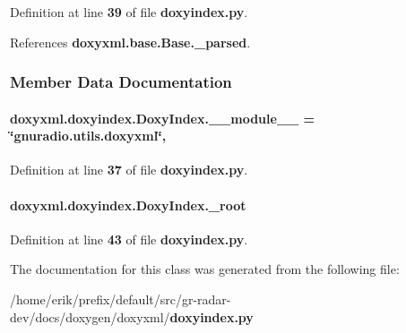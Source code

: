 Definition at line {\bf 39} of file {\bf doxyindex.\+py}.



References {\bf doxyxml.\+base.\+Base.\+\_\+parsed}.



\subsubsection{Member Data Documentation}
\paragraph[{\+\_\+\+\_\+module\+\_\+\+\_\+}]{ doxyxml.\+doxyindex.\+Doxy\+Index.\+\_\+\+\_\+module\+\_\+\+\_\+ = \char`\"{}gnuradio.\+utils.\+doxyxml\char`\"{}\hspace{0.3cm}{\ttfamily [static]}, {\ttfamily [private]}}\label{classdoxyxml_1_1doxyindex_1_1DoxyIndex_a3b447ba1116993b5c288b088d7f8ae74}


Definition at line {\bf 37} of file {\bf doxyindex.\+py}.

\paragraph[{\+\_\+root}]{\setlength{\rightskip}{0pt plus 5cm}doxyxml.\+doxyindex.\+Doxy\+Index.\+\_\+root\hspace{0.3cm}{\ttfamily [private]}}\label{classdoxyxml_1_1doxyindex_1_1DoxyIndex_a1b06ad4e43a39cf0ab0b39e413f3b777}


Definition at line {\bf 43} of file {\bf doxyindex.\+py}.



The documentation for this class was generated from the following file\+:\begin{DoxyCompactItemize}
\item 
/home/erik/prefix/default/src/gr-\/radar-\/dev/docs/doxygen/doxyxml/{\bf doxyindex.\+py}\end{DoxyCompactItemize}

